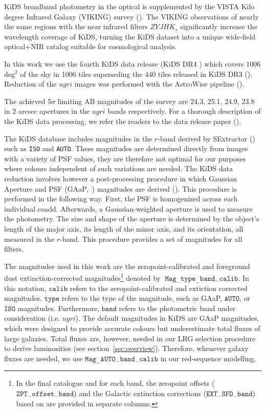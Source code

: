 \documentclass[fleqn,usenatbib,useAMS]{mnras}
\begin{document}
KiDS broadband photometry in the optical is supplemented by the VISTA Kilo degree Infrared Galaxy (VIKING) survey (\citealt{irwin2004,lewis2010,Edge2013,Gonz2018}). The VIKING observations of nearly the same regions with the near infrared filters $ZYJHK_{s}$ significantly increase the wavelength coverage of KiDS, turning the KiDS dataset into a unique wide-field optical+NIR catalog suitable for cosmological analysis.

In this work we use the fourth KiDS data release (KiDS DR4 \citealt{kuijken2019}) which covers $1006$ deg$^{2}$ of the sky in 1006 tiles superseding the 440 tiles released in KiDS DR3 (\citealt{kids_dr3}). Reduction of the $ugri$ images was performed with the AstroWise pipeline (\citealt{omegacam}).  


The achieved 5$\sigma$ limiting AB magnitudes of the survey are 24.3, 25.1, 24.9, 23.8 in $2$ arcsec apertures in the $ugri$ bands respectively. For a thorough description of the KiDS data processing, we refer the readers to the data release paper (\citealt{kuijken2019}). 

The KiDS database includes magnitudes in the $r$-band derived by SExtractor (\citealt{sextractor}) such as \texttt{ISO} and \texttt{AUTO}. These magnitudes are determined directly from images with a variety of PSF values, they are therefore not optimal for our purposes where colours independent of such variations are needed. The KiDS data reduction involves however a post-processing procedure in which Gaussian Aperture and PSF (GAaP,~\citealt{gaap}) magnitudes are derived (\citealt{kuijken2015}). This procedure is performed in the following way. First, the PSF is homogenized across each individual coadd. Afterwards, a Gaussian-weighted aperture is used to measure the photometry. The size and shape of the aperture is determined by the object's length of the major axis, its length of the minor axis, and its orientation, all measured in the $r$-band. This procedure provides a set of magnitudes for all filters. 

The magnitudes used in this work are the zeropoint-calibrated and foreground dust extinction-corrected magnitudes\footnote{In the final catalogue and for each band, the zeropoint offsets ($\mathtt{ZPT}_{-}\mathtt{offset}_{-}\mathtt{band}$) and the Galactic extinction corrections ($\mathtt{EXT}_{-}\mathtt{SFD}_{-}\mathtt{band}$) based on \citet{schlegel98} are provided in separate columns.} 
denoted by $\; \mathtt{Mag}_{-}\mathtt{type}_{-}\mathtt{band}_{-}\mathtt{calib}$. 
In this notation, $\mathtt{calib}$ refers to the zeropoint-calibrated and extiction corrected magnitudes. $\mathtt{type}$ refers to the type of the magnitude, such as GAaP, $\mathtt{AUTO}$, or $\mathtt{ISO}$ magnitudes. Furthermore, $\mathtt{band}$ refers to the photometric band under consideration (i.e. $ugri$). The default magnitudes in KiDS are GAaP magnitudes, which were designed to provide accurate colours but underestimate total fluxes of large galaxies. Total fluxes are, however, needed in our LRG selection procedure to derive luminosities (see section~\ref{sec:overview}). Therefore, whenever galaxy fluxes are needed, we use $\mathtt{Mag}_{-}\mathtt{AUTO}_{-}\mathtt{band}_{-}\mathtt{calib}$ in our red-sequence modelling. 
\end{document}
